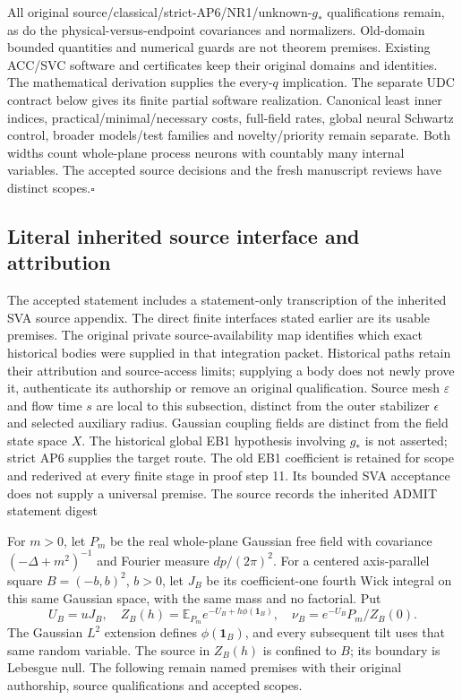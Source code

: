\documentclass[11pt]{article}
\theoremstyle{plain}
\theoremstyle{definition}
\theoremstyle{remark}
\newcommand{\E}{\mathbb{E}}
\begin{document}
All original source/classical/strict-AP6/NR1/unknown-$g_*$ qualifications
remain, as do the physical-versus-endpoint covariances and normalizers.
Old-domain bounded quantities and numerical guards are not theorem premises.
Existing ACC/SVC software and certificates keep their original domains
and identities. The mathematical derivation supplies the every-$q$ implication.
The separate UDC contract below gives its finite partial software realization.
Canonical least inner indices, practical/minimal/necessary costs, full-field
rates, global neural Schwartz control, broader models/test families and
novelty/priority remain separate. Both widths count whole-plane process
neurons with countably many internal variables. The accepted source decisions
and the fresh manuscript reviews have distinct scopes.\hfill$\square$


\subsection{Literal inherited source interface and attribution}
\label{uda:source}
The accepted statement includes a statement-only transcription of the
inherited SVA source appendix. The direct finite interfaces stated earlier
are its usable premises. The original private source-availability map identifies
which exact historical bodies were supplied in that integration packet.
Historical paths retain their attribution and source-access limits; supplying
a body does not newly prove it, authenticate its authorship or remove an
original qualification.
Source mesh $\varepsilon$ and flow time $s$ are local to this subsection,
distinct from the outer stabilizer $\epsilon$ and selected auxiliary radius.
Gaussian coupling fields are distinct from the field state space $X$.
The historical global EB1 hypothesis involving $g_*$ is not asserted;
strict AP6 supplies the target route. The old EB1 coefficient is retained
for scope and rederived at every finite stage in proof step 11.
Its bounded SVA acceptance does not supply a universal premise.
The source records the inherited ADMIT statement digest
\par{}\par

For $m>0$, let $P_m$ be the real whole-plane Gaussian free field with
covariance $(-\Delta+m^2)^{-1}$ and Fourier measure $dp/(2\pi)^2$.
For a centered axis-parallel square $B=(-b,b)^2$, $b>0$, let $J_B$ be its
coefficient-one fourth Wick integral on this same Gaussian space, with the
same mass and no factorial. Put
\[
 U_B=uJ_B,\quad Z_B(h)=\E_{P_m}e^{-U_B+h\phi(\mathbf1_B)},\quad
 \nu_B=e^{-U_B}P_m/Z_B(0).
\]
The Gaussian $L^2$ extension defines $\phi(\mathbf1_B)$, and every subsequent
tilt uses that same random variable. The source in $Z_B(h)$ is confined to
$B$; its boundary is Lebesgue null. The following remain named premises
with their original authorship, source qualifications and accepted scopes.
\end{document}

